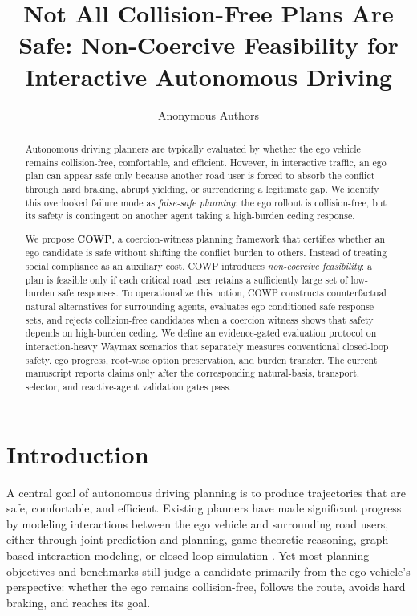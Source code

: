 \documentclass[10pt]{article}
\title{Not All Collision-Free Plans Are Safe: Non-Coercive Feasibility for Interactive Autonomous Driving}
\author{Anonymous Authors}
\date{}
\begin{document}
\maketitle

\begin{abstract} Autonomous driving planners are typically evaluated by whether the ego vehicle remains collision-free, comfortable, and efficient. However, in interactive traffic, an ego plan can appear safe only because another road user is forced to absorb the conflict through hard braking, abrupt yielding, or surrendering a legitimate gap. We identify this overlooked failure mode as \emph{false-safe planning}: the ego rollout is collision-free, but its safety is contingent on another agent taking a high-burden ceding response. 

We propose \textbf{COWP}, a coercion-witness planning framework that certifies whether an ego candidate is safe without shifting the conflict burden to others. Instead of treating social compliance as an auxiliary cost, COWP introduces \emph{non-coercive feasibility}: a plan is feasible only if each critical road user retains a sufficiently large set of low-burden safe responses. To operationalize this notion, COWP constructs counterfactual natural alternatives for surrounding agents, evaluates ego-conditioned safe response sets, and rejects collision-free candidates when a coercion witness shows that safety depends on high-burden ceding. We define an evidence-gated evaluation protocol on interaction-heavy Waymax scenarios that separately measures conventional closed-loop safety, ego progress, root-wise option preservation, and burden transfer. The current manuscript reports claims only after the corresponding natural-basis, transport, selector, and reactive-agent validation gates pass. \end{abstract} \section{Introduction} \label{sec:introduction} A central goal of autonomous driving planning is to produce trajectories that are safe, comfortable, and efficient. Existing planners have made significant progress by modeling interactions between the ego vehicle and surrounding road users, either through joint prediction and planning, game-theoretic reasoning, graph-based interaction modeling, or closed-loop simulation \cite{gameformer, jia2022hdgt, wang2024socialformer, renz2022plant, dauner2023parting}. Yet most planning objectives and benchmarks still judge a candidate primarily from the ego vehicle's perspective: whether the ego remains collision-free, follows the route, avoids hard braking, and reaches its goal. 
\end{document}
